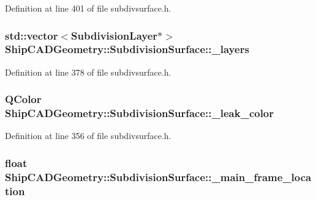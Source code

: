 Definition at line 401 of file subdivsurface.\-h.

\hypertarget{classShipCADGeometry_1_1SubdivisionSurface_adabe1dd268e280a6d21e3c546639175a}{
\subsubsection[{\-\_\-layers}]{\setlength{\rightskip}{0pt plus 5cm}std\-::vector$<${\bf Subdivision\-Layer}$\ast$$>$ Ship\-C\-A\-D\-Geometry\-::\-Subdivision\-Surface\-::\-\_\-layers\hspace{0.3cm}{\ttfamily [protected]}}}\label{classShipCADGeometry_1_1SubdivisionSurface_adabe1dd268e280a6d21e3c546639175a}


Definition at line 378 of file subdivsurface.\-h.

\hypertarget{classShipCADGeometry_1_1SubdivisionSurface_a802e546e42b45b2c379490ab72391914}{
\subsubsection[{\-\_\-leak\-\_\-color}]{\setlength{\rightskip}{0pt plus 5cm}Q\-Color Ship\-C\-A\-D\-Geometry\-::\-Subdivision\-Surface\-::\-\_\-leak\-\_\-color\hspace{0.3cm}{\ttfamily [protected]}}}\label{classShipCADGeometry_1_1SubdivisionSurface_a802e546e42b45b2c379490ab72391914}


Definition at line 356 of file subdivsurface.\-h.

\hypertarget{classShipCADGeometry_1_1SubdivisionSurface_a6fc67d1abe025264cceec88f7bcc10e7}{
\subsubsection[{\-\_\-main\-\_\-frame\-\_\-location}]{\setlength{\rightskip}{0pt plus 5cm}float Ship\-C\-A\-D\-Geometry\-::\-Subdivision\-Surface\-::\-\_\-main\-\_\-frame\-\_\-location\hspace{0.3cm}{\ttfamily [protected]}}}\label{classShipCADGeometry_1_1SubdivisionSurface_a6fc67d1abe025264cceec88f7bcc10e7}



